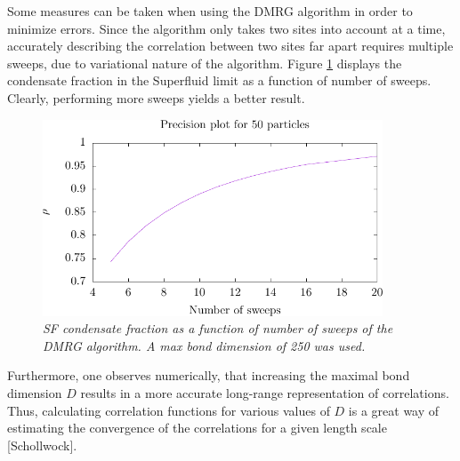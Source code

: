 Some measures can be taken when using the DMRG algorithm in order to minimize errors. Since the algorithm only takes two sites into account at a time, accurately describing the correlation between two sites far apart requires multiple sweeps, due to variational nature of the algorithm. Figure \ref{fig:sweepdependence} displays the condensate fraction in the Superfluid limit as a function of number of sweeps. Clearly, performing more sweeps yields a better result.
\begin{figure}[h!]
    \centering
    \includegraphics[width=0.9\textwidth]{Figures/condFracSweeps.pdf}
    \caption{\textit{SF condensate fraction as a function of number of sweeps of the DMRG algorithm. A max bond dimension of 250 was used.}}
    \label{fig:sweepdependence}
\end{figure}
Furthermore, one observes numerically, that increasing the maximal bond dimension $D$ results in a more accurate long-range representation of correlations. Thus, calculating correlation functions for various values of $D$ is a great way of estimating the convergence of the correlations for a given length scale [Schollwock].


